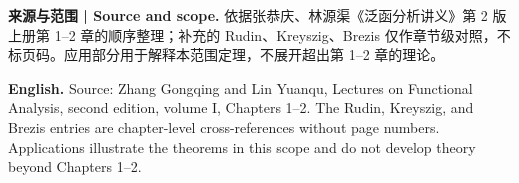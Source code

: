 \documentclass[UTF8,11pt,a4paper]{ctexart}
\newcommand{\EN}[1]{\par\noindent \textbf{English.} #1\par}
\begin{document}
\par\medskip\begingroup\small
\noindent\textbf{来源与范围 | Source and scope.} 依据张恭庆、林源渠《泛函分析讲义》第 2 版上册第 1--2 章的顺序整理；补充的 Rudin、Kreyszig、Brezis 仅作章节级对照，不标页码。应用部分用于解释本范围定理，不展开超出第 1--2 章的理论。
\EN{Source: Zhang Gongqing and Lin Yuanqu, Lectures on Functional Analysis, second edition, volume I, Chapters 1--2. The Rudin, Kreyszig, and Brezis entries are chapter-level cross-references without page numbers. Applications illustrate the theorems in this scope and do not develop theory beyond Chapters 1--2.}
\par\endgroup
\end{document}
